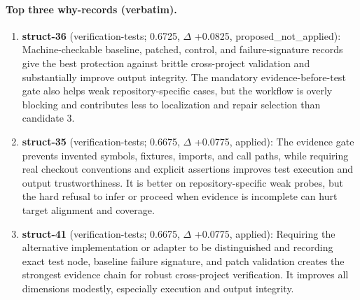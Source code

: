 \paragraph{Top three why-records (verbatim).}\begin{enumerate}\itemsep1pt
\item \textbf{struct-36} (verification-tests; 0.6725, $\Delta$ +0.0825, proposed\_not\_applied): Machine-checkable baseline, patched, control, and failure-signature records give the best protection against brittle cross-project validation and substantially improve output integrity. The mandatory evidence-before-test gate also helps weak repository-specific cases, but the workflow is overly blocking and contributes less to localization and repair selection than candidate 3.
\item \textbf{struct-35} (verification-tests; 0.6675, $\Delta$ +0.0775, applied): The evidence gate prevents invented symbols, fixtures, imports, and call paths, while requiring real checkout conventions and explicit assertions improves test execution and output trustworthiness. It is better on repository-specific weak probes, but the hard refusal to infer or proceed when evidence is incomplete can hurt target alignment and coverage.
\item \textbf{struct-41} (verification-tests; 0.6675, $\Delta$ +0.0775, applied): Requiring the alternative implementation or adapter to be distinguished and recording exact test node, baseline failure signature, and patch validation creates the strongest evidence chain for robust cross-project verification. It improves all dimensions modestly, especially execution and output integrity.
\end{enumerate}
